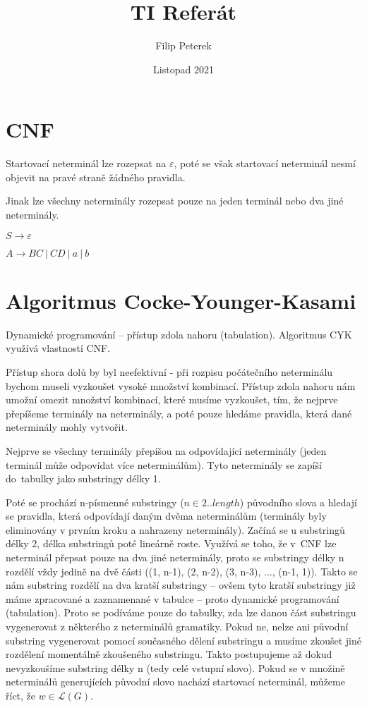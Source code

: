 \documentclass{article}
\title{TI Referát}
\author{Filip Peterek}
\date{Listopad 2021}
\begin{document}
\maketitle

\section{CNF}

Startovací neterminál lze rozepsat na $\varepsilon$, poté
se však startovací neterminál nesmí objevit na pravé straně
žádného pravidla.

Jinak lze všechny neterminály rozepsat pouze na jeden
terminál nebo dva jiné neterminály.

$S \rightarrow \varepsilon$

$A \rightarrow BC \: | \: CD \: | \: a \: | \: b$

\section{Algoritmus Cocke-Younger-Kasami}

Dynamické programování -- přístup zdola nahoru (tabulation).
Algoritmus CYK využívá vlastností CNF. 

Přístup shora dolů by byl neefektivní - při rozpisu počátečního
neterminálu bychom museli vyzkoušet vysoké množství kombinací.
Přístup zdola nahoru nám umožní omezit množství kombinací, které
musíme vyzkoušet, tím, že nejprve přepíšeme terminály na neterminály,
a poté pouze hledáme pravidla, která dané neterminály mohly vytvořit.

Nejprve se všechny terminály přepíšou na odpovídající
neterminály (jeden terminál může odpovídat více neterminálům).
Tyto neterminály se zapíší do~tabulky jako substringy délky 1.

Poté se prochází n-písmenné substringy ($n \in 2..length$)
původního slova a hledají se pravidla, která odpovídají daným
dvěma neterminálům (terminály byly eliminovány v prvním kroku a
nahrazeny neterminály). Začíná se u substringů délky 2, délka
substringů poté lineárně roste. Využívá se toho, že v~CNF
lze neterminál přepsat pouze na dva jiné neterminály,
proto se substringy délky n rozdělí vždy jedině na dvě části
((1, n-1), (2, n-2), (3, n-3), ..., (n-1, 1)). Takto se nám
substring rozdělí na dva kratší substringy -- ovšem tyto
kratší substringy již máme zpracované a zaznamenané v tabulce
-- proto dynamické programování (tabulation). Proto se podíváme
pouze do tabulky, zda lze danou část substringu vygenerovat z některého
z neterminálů gramatiky. Pokud ne, nelze ani původní substring
vygenerovat pomocí současného dělení substringu a musíme zkoušet
jiné rozdělení momentálně zkoušeného substringu. Takto postupujeme
až dokud nevyzkoušíme substring délky n (tedy celé vstupní slovo).
Pokud se v množině neterminálů generujících původní slovo nachází
startovací neterminál, můžeme říct, že $w \in 
\mathcal{L}(G)$.
\end{document}
